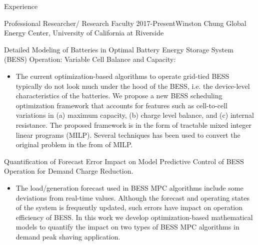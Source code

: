 \documentclass{resume} %
\begin{document}
\begin{rSection}{ Experience}


\begin{rSubsection}{Professional Researcher/  Research Faculty}{ 2017-Present}{Winston Chung Global Energy Center, University of California at Riverside}{}

\vspace{0.26cm}

\item[]  Detailed Modeling of Batteries in Optimal Battery Energy Storage System (BESS) Operation: Variable Cell Balance and Capacity:

\begin{itemize}
   \item  []  The current optimization-based algorithms to operate grid-tied BESS typically do not look much under the hood of the BESS, i.e. the device-level characteristics of the batteries. We propose a new BESS
scheduling optimization framework that accounts for features  such as cell-to-cell variations in (a) maximum capacity, (b) charge level balance, and (c) internal resistance. 
The proposed framework is in the form of tractable mixed integer linear programs (MILP). 
Several  techniques has been  used to convert the original problem in the from of MILP.
\end{itemize}

\item[]  Quantification of Forecast Error Impact on  Model Predictive Control of BESS Operation for Demand Charge Reduction.
\begin{itemize}
   \item  []  The load/generation forecast used in BESS MPC algorithms include some deviations from real-time values. 
 Although the forecast and operating states of the system is frequently updated, such errors have impact on operation efficiency of BESS.
In this work we develop optimization-based mathematical models to quantify the impact on two types of BESS MPC algorithms in demand peak shaving application.  
\end{itemize}


\end{rSubsection}
\end{rSection}
\end{document}

